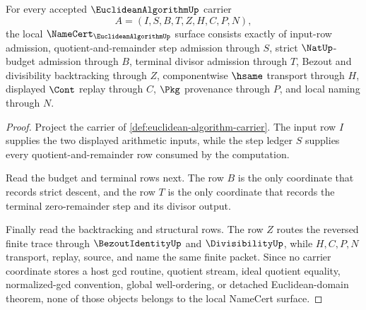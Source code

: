 \begin{theorem}
\label{thm:euclidean-algorithm-namecert-obligations}
For every accepted $\EuclideanAlgorithmUp$ carrier
$$
A=(I,S,B,T,Z,H,C,P,N),
$$
the local $\NameCert_{\EuclideanAlgorithmUp}$ surface consists exactly of input-row admission, quotient-and-remainder step admission through $S$, strict $\NatUp$-budget admission through $B$, terminal divisor admission through $T$, Bezout and divisibility backtracking through $Z$, componentwise $\hsame$ transport through $H$, displayed $\Cont$ replay through $C$, $\Pkg$ provenance through $P$, and local naming through $N$.
\end{theorem}
\begin{proof}
Project the carrier of \autoref{def:euclidean-algorithm-carrier}. The input row $I$ supplies the two displayed arithmetic inputs, while the step ledger $S$ supplies every quotient-and-remainder row consumed by the computation.

Read the budget and terminal rows next. The row $B$ is the only coordinate that records strict descent, and the row $T$ is the only coordinate that records the terminal zero-remainder step and its divisor output.

Finally read the backtracking and structural rows. The row $Z$ routes the reversed finite trace through $\BezoutIdentityUp$ and $\DivisibilityUp$, while $H,C,P,N$ transport, replay, source, and name the same finite packet. Since no carrier coordinate stores a host gcd routine, quotient stream, ideal quotient equality, normalized-gcd convention, global well-ordering, or detached Euclidean-domain theorem, none of those objects belongs to the local NameCert surface.
\end{proof}

